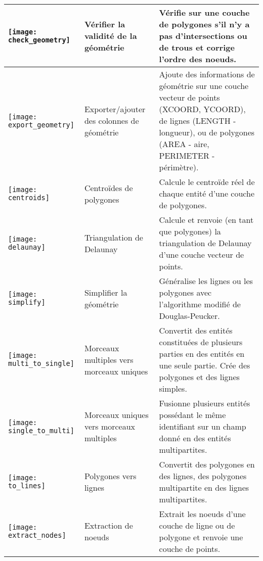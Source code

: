 \begin{table}[ht]
\begin{tabular}{|p{0.3in}|p{1.2in}|p{4.8in}|}
 \hline \texttt{[image: check\_geometry]} & Vérifier la validité de la géométrie & Vérifie sur une couche de polygones s'il n'y a pas d'intersections ou de trous et corrige l'ordre des noeuds. \\
 \hline \texttt{[image: export\_geometry]} & Exporter/ajouter des colonnes de géométrie & Ajoute des informations de géométrie sur une couche vecteur de points (XCOORD, YCOORD), de lignes (LENGTH - longueur), ou de polygones (AREA - aire, PERIMETER - périmètre). \\
 \hline \texttt{[image: centroids]} & Centroïdes de polygones & Calcule le centroïde réel de chaque entité d'une couche de polygones. \\
 \hline \texttt{[image: delaunay]} & Triangulation de Delaunay & Calcule et renvoie (en tant que polygones) la triangulation de Delaunay d'une couche vecteur de points. \\
 \hline \texttt{[image: simplify]} & Simplifier la géométrie & Généralise les lignes ou les polygones avec l'algorithme modifié de Douglas-Peucker. \\
 \hline \texttt{[image: multi\_to\_single]} & Morceaux multiples vers morceaux uniques & Convertit des entités constituées de plusieurs parties en des entités en une seule partie. Crée des polygones et des lignes simples. \\
 \hline \texttt{[image: single\_to\_multi]} & Morceaux uniques vers morceaux multiples & Fusionne plusieurs entités possédant le même identifiant sur un champ donné en des entités multipartites. \\
 \hline \texttt{[image: to\_lines]} & Polygones vers lignes & Convertit des polygones en des lignes, des polygones multipartite en des lignes multipartites. \\
 \hline \texttt{[image: extract\_nodes]} & Extraction de noeuds & Extrait les noeuds d'une couche de ligne ou de polygone et renvoie une couche de points. \\
 \hline
\end{tabular}
\end{table}

